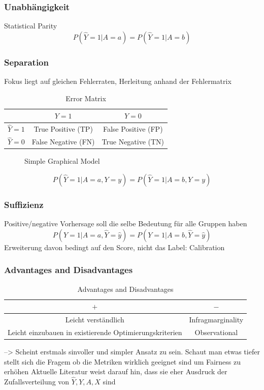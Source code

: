 \documentclass[aspectratio=169]{beamer}
\begin{document}
\begin{frame}
	\frametitle{Unabhängigkeit}
	Statistical Parity
	$$P(\hat{Y} = 1 | A = a) = P(\hat{Y} = 1 | A = b)$$
\end{frame}

\begin{frame}
	\frametitle{Separation}
	Fokus liegt auf gleichen Fehlerraten, Herleitung anhand der Fehlermatrix
	\begin{table}[H]
		\centering
		\begin{tabular}{c|c|c}
		\toprule
		 & $Y = 1$ & $Y = 0$ \\
		\midrule
		$ \hat{Y} = 1$ & True Positive (TP) & False Positive (FP) \\
		$ \hat{Y} = 0$ & False Negative (FN) & True Negative (TN) \\
		\bottomrule
		\end{tabular}
		\caption{Error Matrix}
		\end{table}
	\begin{figure}[H]
	\centering
	\caption{Simple Graphical Model}
	\end{figure}
	$$P(\hat{Y} = 1 | A = a, Y = y) = P(\hat{Y} = 1 | A = b, Y = y)$$
\end{frame}

\begin{frame}
	\frametitle{Suffizienz}
	Positive/negative Vorhersage soll die selbe Bedeutung für alle Gruppen haben
	$$P(Y = 1 | A = a, \hat{Y} = \hat{y}) = P(Y = 1 | A = b, \hat{Y} = \hat{y})$$
	Erweiterung davon bedingt auf den Score, nicht das Label: Calibration
\end{frame}
\begin{frame}
	\frametitle{Advantages and Disadvantages}
	\begin{table}[H]
	\centering
	\begin{tabular}{c|c}
	\toprule
	$+$ & $-$ \\
	\midrule
	Leicht verständlich & Infragmarginality \\
	Leicht einzubauen in existierende Optimierungskriterien & Observational \\
	\bottomrule
	\end{tabular}
	\caption{Advantages and Disadvantages}
	\end{table}
	--> Scheint erstmals sinvoller und simpler Ansatz zu sein. Schaut man etwas tiefer stellt sich
	die Fragem ob die Metriken wirklich geeignet sind um Fairness zu erhöhen
	Aktuelle Literatur weist darauf hin, dass sie eher Ausdruck der Zufallsverteilung
	von $\hat{Y}, Y, A, X$ sind
\end{frame}
\end{document}

